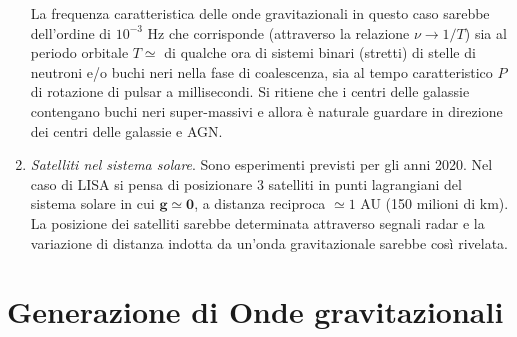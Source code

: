 \begin{enumerate}
  La frequenza caratteristica delle onde gravitazionali in questo caso sarebbe
  dell'ordine di $10^{-3}$ Hz che corrisponde (attraverso la relazione $\nu \to
  1/T$) sia al periodo orbitale $T \simeq $ di qualche ora di sistemi binari
  (stretti) di stelle di neutroni e/o buchi neri nella fase di coalescenza, sia
  al tempo caratteristico $P$ di rotazione di pulsar a millisecondi. Si ritiene
  che i centri delle galassie contengano buchi neri super-massivi e allora è
  naturale guardare in direzione dei centri delle galassie e AGN.
\item \emph{Satelliti nel sistema solare}.  Sono esperimenti previsti per gli
  anni 2020.  Nel caso di LISA si pensa di posizionare 3 satelliti in punti
  lagrangiani del sistema solare in cui $\bm{g} \simeq \bm{0}$, a distanza
  reciproca $\simeq 1$ AU (150 milioni di km).  La posizione dei satelliti
  sarebbe determinata attraverso segnali radar e la variazione di distanza
  indotta da un'onda gravitazionale sarebbe così rivelata.

\end{enumerate}

\section{Generazione di Onde gravitazionali}
\label{sec:onde-grav-masse}

